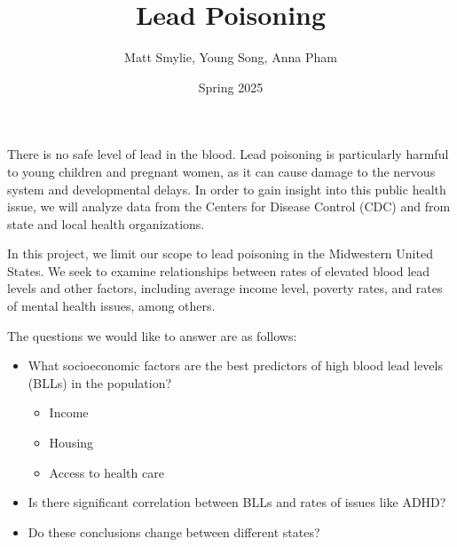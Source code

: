 \documentclass[12pt]{article}
\title{Lead Poisoning}
\author	{Matt Smylie, Young Song, Anna Pham}
\date{Spring 2025}
\begin{document}
	\maketitle
	\onehalfspacing
	There is no safe level of lead in the blood. Lead poisoning is particularly harmful to young children and pregnant women, as it can cause damage to the nervous system and developmental delays. In order to gain insight into this public health issue, we will analyze data from the Centers for Disease Control (CDC) and from state and local health organizations.
	
	In this project, we limit our scope to lead poisoning in the Midwestern United States. We seek to examine relationships between rates of elevated blood lead levels and other factors, including average income level, poverty rates, and rates of mental health issues, among others.
	
	The questions we would like to answer are as follows:
	\begin{itemize}
		\item What socioeconomic factors are the best predictors of high blood lead levels (BLLs) in the population?
		\begin{itemize}
			\item Income
			\item Housing
			\item Access to health care
		\end{itemize}
		\item Is there significant correlation between BLLs and rates of issues like ADHD?
		\item Do these conclusions change between different states?
	\end{itemize}
\end{document}
